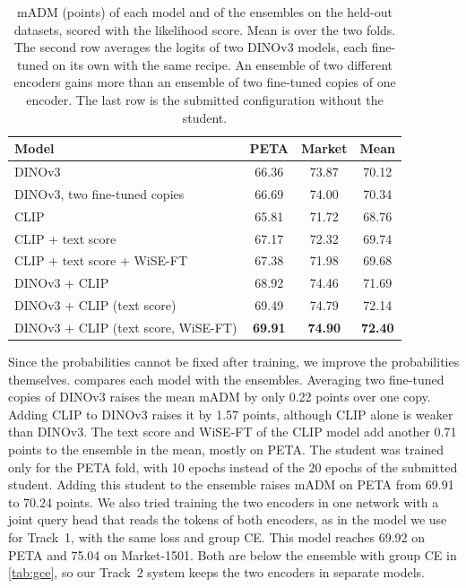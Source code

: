 \documentclass[10pt,twocolumn,letterpaper]{article}
\begin{document}
\begin{table}[t]
\centering
\small
\setlength{\tabcolsep}{4pt}
\begin{tabular}{@{}lccc@{}}
\toprule
Model & PETA & Market & Mean \\
\midrule
DINOv3 & 66.36 & 73.87 & 70.12 \\
DINOv3, two fine-tuned copies & 66.69 & 74.00 & 70.34 \\
CLIP & 65.81 & 71.72 & 68.76 \\
CLIP + text score & 67.17 & 72.32 & 69.74 \\
CLIP + text score + WiSE-FT & 67.38 & 71.98 & 69.68 \\
\midrule
DINOv3 + CLIP & 68.92 & 74.46 & 71.69 \\
DINOv3 + CLIP (text score) & 69.49 & 74.79 & 72.14 \\
DINOv3 + CLIP (text score, WiSE-FT) & \textbf{69.91} & \textbf{74.90} & \textbf{72.40} \\
\bottomrule
\end{tabular}
\caption{mADM (points) of each model and of the ensembles on the held-out datasets, scored with the likelihood score. Mean is over the two folds. The second row averages the logits of two DINOv3 models, each fine-tuned on its own with the same recipe. An ensemble of two different encoders gains more than an ensemble of two fine-tuned copies of one encoder. The last row is the submitted configuration without the student.}
\label{tab:enc}
\end{table}

Since the probabilities cannot be fixed after training, we improve the probabilities themselves.  compares each model with the ensembles. Averaging two fine-tuned copies of DINOv3 raises the mean mADM by only 0.22 points over one copy. Adding CLIP to DINOv3 raises it by 1.57 points, although CLIP alone is weaker than DINOv3. The text score and WiSE-FT of the CLIP model add another 0.71 points to the ensemble in the mean, mostly on PETA. The student was trained only for the PETA fold, with 10 epochs instead of the 20 epochs of the submitted student. Adding this student to the ensemble raises mADM on PETA from 69.91 to 70.24 points. We also tried training the two encoders in one network with a joint query head that reads the tokens of both encoders, as in the model we use for Track~1, with the same loss and group CE. This model reaches 69.92 on PETA and 75.04 on Market-1501. Both are below the ensemble with group CE in \cref{tab:gce}, so our Track~2 system keeps the two encoders in separate models.
\end{document}
